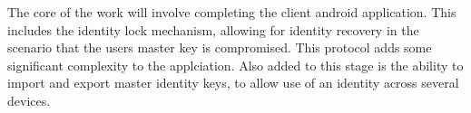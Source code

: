 The core of the work will involve completing the client android application. This includes the identity lock mechanism, allowing for identity recovery in the scenario that the users master key is compromised. This protocol adds some significant complexity to the applciation. Also added to this stage is the ability to import and export master identity keys, to allow use of an identity across several devices.
